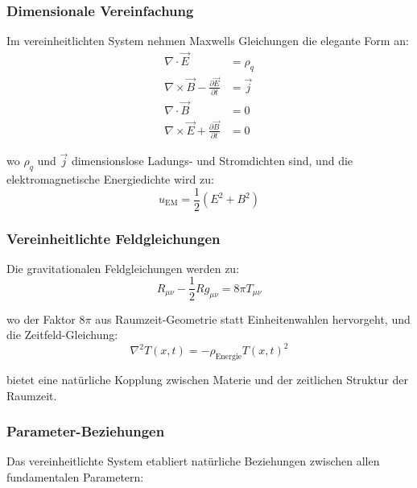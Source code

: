 \documentclass[12pt,a4paper]{article}
\newcommand{\Tfieldt}{T(x,t)}
\begin{document}
	\subsubsection{Dimensionale Vereinfachung}
	\label{subsubsec:dimensional_simplification}
	
	Im vereinheitlichten System nehmen Maxwells Gleichungen die elegante Form an:
	\begin{align}
		\nabla \cdot \vec{E} &= \rho_q \\
		\nabla \times \vec{B} - \frac{\partial \vec{E}}{\partial t} &= \vec{j} \\
		\nabla \cdot \vec{B} &= 0 \\
		\nabla \times \vec{E} + \frac{\partial \vec{B}}{\partial t} &= 0
	\end{align}
	
	wo $\rho_q$ und $\vec{j}$ dimensionslose Ladungs- und Stromdichten sind, und die elektromagnetische Energiedichte wird zu:
	\begin{equation}
		u_{\text{EM}} = \frac{1}{2}(E^2 + B^2)
	\end{equation}
	
	\subsubsection{Vereinheitlichte Feldgleichungen}
	\label{subsubsec:unified_field_equations}
	
	Die gravitationalen Feldgleichungen werden zu:
	\begin{equation}
		R_{\mu\nu} - \frac{1}{2}Rg_{\mu\nu} = 8\pi T_{\mu\nu}
	\end{equation}
	
	wo der Faktor $8\pi$ aus Raumzeit-Geometrie statt Einheitenwahlen hervorgeht, und die Zeitfeld-Gleichung:
	\begin{equation}
		\nabla^2 \Tfieldt = -\rho_{\text{Energie}} \Tfieldt^2
	\end{equation}
	
	bietet eine natürliche Kopplung zwischen Materie und der zeitlichen Struktur der Raumzeit.
	
	\subsubsection{Parameter-Beziehungen}
	\label{subsubsec:parameter_relationships}
	
	Das vereinheitlichte System etabliert natürliche Beziehungen zwischen allen fundamentalen Parametern:
	
\end{document}
